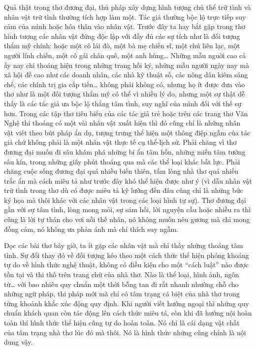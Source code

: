 \documentclass[../main.tex]{subfiles}
\begin{document}
\begin{multicols}{2}
Quả thật trong thơ đương đại, thủ pháp xây dựng hình tượng chủ thể trữ tình và nhân vật trữ  tình thường tích hợp làm một. Tác giả thường bộc lộ trực tiếp suy cảm của mình hoặc hóa thân vào nhân vật. Trước đây ta hay bắt gặp trong thơ hình tượng các nhân vật đứng độc lập với đầy đủ các sự tích như là đối tượng thẩm mỹ chính: hoặc một cô lái đò, một bà mẹ chiến sĩ, một chú liên lạc, một người lính chiến, một cô gái chân quê, một anh hùng… Những mẫu nguời cao cả ấy nay chỉ thoáng hiện trong những trang hồi ký, những mẫu người ngày nay mà xã hội đề cao như các doanh nhân, các nhà kỹ thuật số, các nông dân kiêm sáng chế, các chính trị gia cấp tiến… không phải không có, nhưng họ ít được đưa vào thơ như là một đối tượng thẩm mỹ có thể vì nhiều lý do, nhưng một sự thật dễ thấy là các tác giả ưa bộc lộ thẳng tâm tình, suy nghĩ của mình đối với thế sự hơn. Trong các tập thơ tiêu biểu của các tác giả trẻ hoặc trên các trang thơ Văn Nghệ thi thoảng có một vài nhân vật xuất hiện thì đó cũng chỉ là những nhân vật viết theo bút pháp ẩn dụ, tượng trưng thể hiện một thông điệp ngầm của tác giả chứ không phải là một nhân vật thực tế cụ thể-lịch sử. Phải chăng vì thơ đương đại muốn đi sâu khám phá những bí ẩn tâm hồn, những miền tâm tưởng sâu kín, trong những giây phút thoáng qua mà các thể loại khác bất lực. Phải chăng cuộc sống đương đại quá nhiều biến thiên, tấm lòng nhà thơ quá nhiều trắc ẩn mà cách miêu tả như trước đây khó thể hiện được như ý (vì dẫu nhân vật trữ tình trong thơ dù có được miêu tả kỹ lưỡng đến đâu cũng chỉ là những bức ký họa mà thôi khác với các nhân vật trong các loại hình tự sự). Thơ đương đại gần với sự tâm tình, lòng mong mỏi, sự sám hối, lời nguyện cầu hoặc nhiều ra thì cũng là lời tự thán cho vơi nỗi thế nhân, nó không muốn nêu gương mà chỉ mong đồng cảm, nó không ưa phản ánh mà chỉ thích suy ngẫm. 
 
Đọc các  bài thơ bây giờ, ta ít gặp các nhân vật mà chỉ thấy những thoáng tâm tình. Sự đổi thay đó về đối tượng kéo theo một cách thức thể hiện phóng khoáng tự do về hình thức nghệ thuật, không có điều kiện cho một “cách luật” nào được tồn tại và thi thố trên trang chữ của nhà thơ. Nào là thể loại, hình ảnh, ngôn từ… với bao nhiêu quy chuẩn một thời bỗng tan đi rất nhanh nhường chỗ cho những ngữ pháp, thi pháp mới mà chỉ có tâm trạng cá biệt của nhà thơ trong từng khoảnh khắc xúc động quy định. Khi người viết hướng ngoại thì những quy chuẩn khách quan còn tác động lên cách thức miêu tả, còn khi đã hướng nội hoàn toàn thí hình thức thể hiện cũng tự do hoàn toàn. Nó chỉ là cái dạng vật chất của tâm trạng nhà thơ lúc đó  mà thôi. Nó là hình thức những cũng chính là nội dung vậy. 


\end{multicols}
\end{document}
